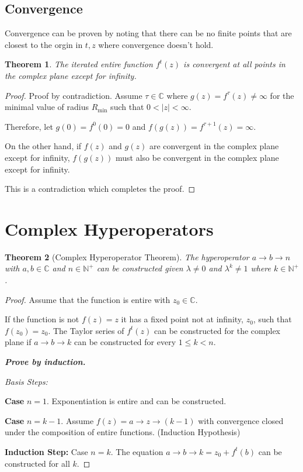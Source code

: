 \documentclass{article}
\newtheorem{theorem}{Theorem}[section]
\theoremstyle{definition}
\begin{document}
\subsection{Convergence}

Convergence can be proven by noting that there can be no finite points that are closest to the orgin in $t, z$ where convergence doesn't hold.
\begin{theorem}
The iterated entire function $f^t(z)$ is convergent at all points in the complex plane except for infinity.
\end{theorem}
\begin{proof}
Proof by contradiction. Assume $\tau \in \mathbb{C}$ where $g(z)=f^{\tau}(z) \neq \infty$ for the minimal value of radius $R_{ \min}$ such that $0 < |z| < \infty$. 

Therefore, let $g(0)=f^0(0)=0$ and $f(g(z))=f^{\tau+1}(z) = \infty$. 

On the other hand, if $f(z)$ and $g(z)$ are convergent in the complex plane except for infinity, $f(g(z))$ must also be convergent in the complex plane except for infinity. 

This is a contradiction which completes the proof. 
\end{proof}

\section{Complex Hyperoperators}

\begin{theorem}[Complex Hyperoperator Theorem]
The hyperoperator $a \rightarrow b \rightarrow n $ with $a,b \in \mathbb{C}$ and $n \in \mathbb{N^+}$ can be constructed given $\lambda \neq 0$ and $\lambda^k \neq 1$ where $k \in \mathbb{N^+}$.
\end{theorem}

\begin{proof} Assume that the function is entire with $z_0 \in \mathbb{C}$. 

If the function is not $f(z)=z$ it has a fixed point not at infinity, $z_0$, such that $f(z_0)=z_0$. The Taylor series of  $f^t(z)$ can be constructed for the complex plane if $a \rightarrow b \rightarrow k$ can be constructed for every $1 \leq k < n$. 

\emph{\textbf{Prove by induction.}} 

\emph{Basis Steps:} 

\textbf{Case} $n=1$. Exponentiation is entire and can be constructed.

\textbf{Case} $n=k-1$. Assume $f(z)=a \rightarrow z \rightarrow (k-1)$ with convergence closed under the composition of entire functions. (Induction Hypothesis) 

\textbf{Induction Step:}
Case $n=k$. The equation $a \rightarrow b \rightarrow k = z_0+f^t(b)$ can be constructed for all $k$. 
\end{proof}
\end{document}
